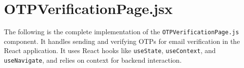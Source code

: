 \documentclass[12pt,a4paper]{report}
\begin{document}
\section{OTPVerificationPage.jsx}

The following is the complete implementation of the \texttt{OTPVerificationPage.js} component. It handles sending and verifying OTPs for email verification in the React application. It uses React hooks like \texttt{useState}, \texttt{useContext}, and \texttt{useNavigate}, and relies on context for backend interaction.

\end{document}
